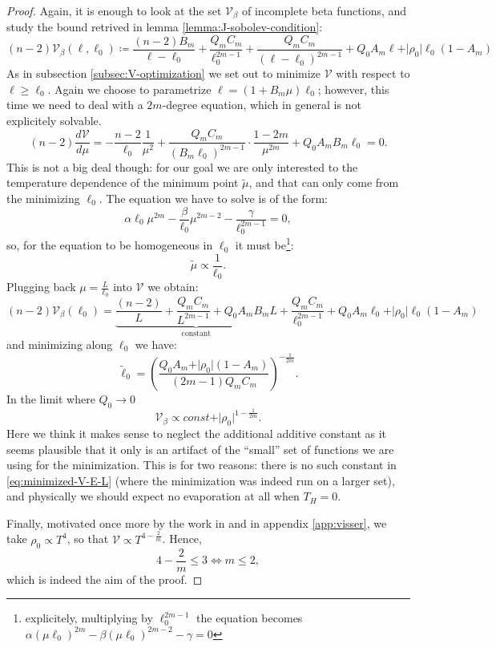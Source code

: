 \begin{proof}
	Again, it is enough to look at the set \(\mathcal{V}_{\beta}\) of incomplete beta functions, and study the bound retrived in lemma \ref{lemma:J-sobolev-condition}:
	\[
	(n - 2)\mathcal{V}_{\beta}(\ell, \ell_0) \coloneqq \frac{(n - 2) B_m}{\ell - \ell_0} + \frac{Q_mC_m}{\ell_0^{2m - 1}} + \frac{Q_mC_m}{(\ell - \ell_0)^{2m - 1}}	+ Q_0A_m\ell + \vert\rho_0\vert\ell_0(1 - A_m)
	\]
	As in subsection \ref{subsec:V-optimization} we set out to minimize \(\mathcal{V}\) with respect to \(\ell \ge \ell_0\). Again we choose to parametrize \(\ell = (1 + B_m\mu)\ell_0\); however, this time we need to deal with a \(2m\)-degree equation, which in general is not explicitely solvable.
	\[
		(n - 2)\frac{d\mathcal{V}}{d\mu} = -\frac{n - 2}{\ell_0} \frac{1}{\mu^2} + \frac{Q_mC_m}{(B_m \ell_0)^{2m - 1}} \cdot \frac{1 - 2m}{\mu^{2m}} + Q_0A_mB_m\ell_0 = 0.
	\]
	This is not a big deal though: for our goal we are only interested to the temperature dependence of the minimum point \(\tilde{\mu}\), and that can only come from the minimizing \(\ell_0\). The equation we have to solve is of the form:
	\[
	\alpha \ell_0 \mu^{2m} - \frac{\beta}{\ell_0}\mu^{2m - 2} - \frac{\gamma}{\ell_0^{2m - 1}} = 0,
	\]
	so, for the equation to be homogeneous in \(\ell_0\) it must be\footnote{explicitely, multiplying by \(\ell_0^{2m - 1}\) the equation becomes \(\alpha(\mu\ell_0)^{2m} - \beta(\mu\ell_0)^{2m -2} - \gamma = 0\)}:
	\[
	\tilde{\mu} \propto \frac{1}{\ell_0}.
	\]
	Plugging back \(\mu = \frac{L}{\ell_0}\) into \(\mathcal{V}\) we obtain:
	\[
		(n - 2)\mathcal{V}_{\beta}(\ell_0) = \underbrace{\frac{(n - 2)}{L} + \frac{Q_mC_m}{L^{2m - 1}} + Q_0A_mB_mL}_{\text{constant}} + \frac{Q_mC_m}{\ell_0^{2m - 1}} + Q_0A_m\ell_0 + \vert\rho_0\vert\ell_0(1 - A_m)	
	\]
	and minimizing along \(\ell_0\) we have:
	\begin{equation}
		\label{eq:state-indipendent-minimal-l0}
		\tilde{\ell}_0	= \left(\frac{Q_0 A_m + \vert\rho_0\vert (1 - A_m)}{(2m - 1)Q_mC_m}\right)^{-\frac{1}{2m}}.
	\end{equation}
	In the limit where \(Q_0 \rightarrow 0\)
	\[
		\mathcal{V}_{\beta} \propto const + \vert \rho_0\vert^{1 - \frac{1}{2m}}.
	\]
	Here we think it makes sense to neglect the additional additive constant as it seems plausible that it only is an artifact of the ``small'' set of functions we are using for the minimization. This is for two reasons: there is no such constant in \eqref{eq:minimized-V-E-L} (where the minimization was indeed run on a larger set), and physically we should expect no evaporation at all when \(T_H = 0\).

	Finally, motivated once more by the work in \cite{levi2016versatile} and in appendix \ref{app:visser}, we take \(\rho_0 \propto T^4\), so that \(\mathcal{V} \propto T^{4 - \frac{2}{m}}\). 
	Hence, 
	\[
		4 - \frac{2}{m} \le 3 \iff m \le 2,	
	\]
	which is indeed the aim of the proof.
\end{proof}
